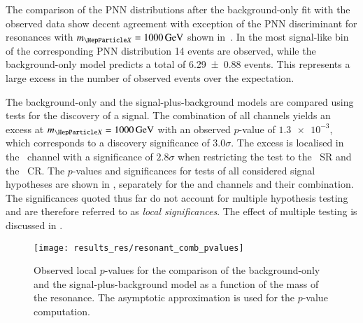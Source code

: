 The comparison of the PNN distributions after the background-only fit with the
observed data show decent agreement with exception of the PNN discriminant for
resonances with $\mX = \SI{1000}{\GeV}$ shown in~. In
the most signal-like bin of the corresponding PNN distribution 14 events are
observed, while the background-only model predicts a total of \num{6.29 +- 0.88}
events. This represents a large excess in the number of observed events over the
expectation.

%
The background-only and the signal-plus-background models are compared using
tests for the discovery of a signal. The combination of all channels yields an
excess at $\mX = \SI{1000}{\GeV}$ with an observed $p$-value of $\num{1.3e-3}$,
which corresponds to a discovery significance of $\num{3.0}\sigma$.
The excess is localised in the \hadhad~channel with a significance of
$\num{2.8}\sigma$ when restricting the test to the \hadhad~SR and the
\ZHF~CR. The $p$-values and significances for tests of all considered signal
hypotheses are shown in , separately for the \lephad and
\hadhad channels and their combination. The significances quoted thus far do not
account for multiple hypothesis testing and are therefore referred to as
\emph{local significances}. The effect of multiple testing is discussed in
.

\begin{figure}[htbp]
  \centering

  \texttt{[image: results\_res/resonant\_comb\_pvalues]}

  \caption[Observed local $p$-values of discovery tests performed in the search
  for resonant \HH production.]{Observed local $p$-values for the comparison of
    the background-only and the signal-plus-background model as a function of
    the mass of the resonance. The asymptotic approximation is used for the
    $p$-value computation.}%
  \label{fig:local_pvalues}

\end{figure}


